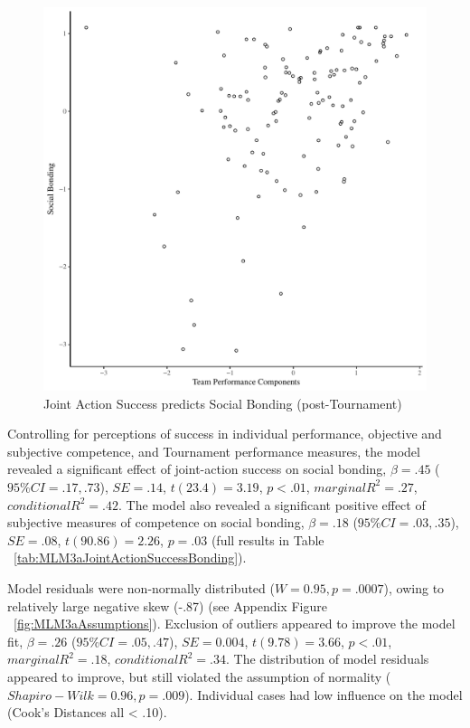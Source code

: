 \begin{landscape}
\begin{figure}[htbp]
\includegraphics[width = \linewidth]{images/jasBondBasicXY.pdf}
  \caption{Joint Action Success predicts Social Bonding (post-Tournament)}
  \label{fig:jasBondBasicXY}
\end{figure}

Controlling for perceptions of success in individual performance, objective and subjective competence, and Tournament performance measures, the model revealed a significant effect of joint-action success on social bonding, $\beta = .45$ ($95\% CI =  .17, .73$), $SE = .14$, $t(23.4) = 3.19$, $p < .01$, $marginal R^2 = .27$, $conditional R^2 = .42$.  The model also revealed a significant positive effect of subjective measures of competence on social bonding, $\beta = .18$ ($95\% CI =  .03, .35$), $SE = .08$, $t(90.86) = 2.26$, $p = .03$ (full results in Table ~\ref{tab:MLM3aJointActionSuccessBonding}).

Model residuals were non-normally distributed ($W = 0.95, p = .0007$), owing to relatively large negative skew (-.87) (see Appendix Figure ~\ref{fig:MLM3aAssumptions}).
Exclusion of outliers appeared to improve the model fit, $\beta = .26$ ($95\% CI =  .05, .47$), $SE = 0.004$, $t(9.78) = 3.66$, $p < .01$, $marginal R^2 = .18$, $conditional R^2 = .34$.  The distribution of model residuals appeared to improve, but still violated the assumption of normality ($Shapiro-Wilk = 0.96, p = .009$).  Individual cases had low influence on the model (Cook's Distances all < .10).


\end{landscape}
